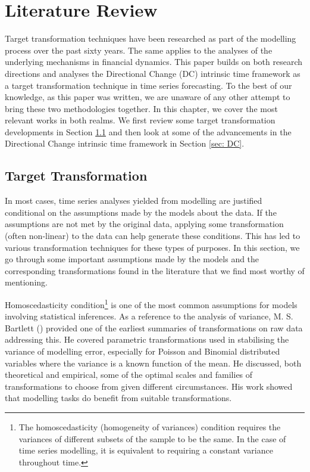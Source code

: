 \chapter{Literature Review}

Target transformation techniques have been researched as part of the modelling process over the past sixty years. The same applies to the analyses of the underlying mechanisms in financial dynamics. This paper builds on both research directions and analyses the Directional Change (DC) intrinsic time framework as a target transformation technique in time series forecasting. To the best of our knowledge, as this paper was written, we are unaware of any other attempt to bring these two methodologies together. In this chapter, we cover the most relevant works in both realms. We first review some target transformation developments in Section \ref{sec: target transformation} and then look at some of the advancements in the Directional Change intrinsic time framework in Section \ref{sec: DC}.

\section{Target Transformation}\label{sec: target transformation}

In most cases, time series analyses yielded from modelling are justified conditional on the assumptions made by the models about the data. If the assumptions are not met by the original data, applying some transformation (often non-linear) to the data can help generate these conditions. This has led to various transformation techniques for these types of purposes. In this section, we go through some important assumptions made by the models and the corresponding transformations found in the literature that we find most worthy of mentioning.

Homoscedasticity condition\footnote{The homoscedasticity (homogeneity of variances) condition requires the variances of different subsets of the sample to be the same. In the case of time series modelling, it is equivalent to requiring a constant variance throughout time.} is one of the most common assumptions for models involving statistical inferences. As a reference to the analysis of variance, M. S. Bartlett (\citeyear{10.2307/3001536}) provided one of the earliest summaries of transformations on raw data addressing this. He covered parametric transformations used in stabilising the variance of modelling error, especially for Poisson and Binomial distributed variables where the variance is a known function of the mean. He discussed, both theoretical and empirical, some of the optimal scales and families of transformations to choose from given different circumstances. His work showed that modelling tasks do benefit from suitable transformations.


